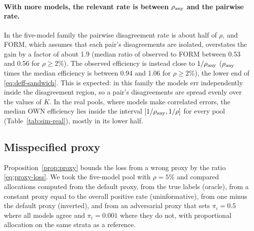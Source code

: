 \documentclass[pdflatex,sn-mathphys-num,iicol]{sn-jnl}
\theoremstyle{thmstyleone}
\theoremstyle{thmstyletwo}
\theoremstyle{thmstylethree}
\begin{document}
\paragraph{With more models, the relevant rate is between $\rho_{\rm any}$ and the pairwise rate.} In
the five-model family the pairwise disagreement rate is about half of $\rho$, and FORM, which assumes
that each pair's disagreements are isolated, overstates the gain by a factor of about 1.9 (median
ratio of observed to FORM between 0.53 and 0.56 for $\rho\ge2\%$). The observed efficiency is instead
close to $1/\rho_{\rm any}$ ($\rho_{\rm any}$ times the median efficiency is between 0.94 and 1.06 for
$\rho\ge2\%$), the lower end of \eqref{eq:deff-sandwich}. This is expected: in this family the models
err independently inside the disagreement region, so a pair's disagreements are spread evenly over
the values of $K$. In the real pools, where models make correlated errors, the median OWN efficiency
lies inside the interval $[1/\rho_{\rm any},1/\rho]$ for every pool (Table~\ref{tab:sim-real}),
mostly in its lower half.

\subsection{Misspecified proxy}\label{sec:sim-proxy}

Proposition~\ref{prop:proxy} bounds the loss from a wrong proxy by the ratio \eqref{eq:proxy-loss}.
We took the five-model pool with $\rho=5\%$ and compared allocations computed from the default proxy,
from the true labels (oracle), from a constant proxy equal to the overall positive rate
(uninformative), from one minus the default proxy (inverted), and from an adversarial proxy that sets
$\pi_i=0.5$ where all models agree and $\pi_i=0.001$ where they do not, with proportional allocation
on the same strata as a reference.
\end{document}
